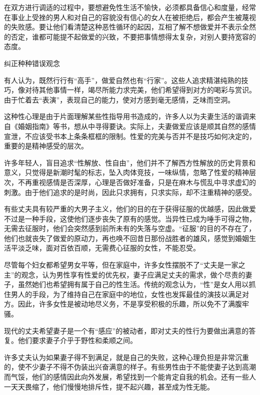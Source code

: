 \documentclass[12pt,UTF8]{ctexbook}
\begin{document}
在双方进行调适的过程中，要想避免性生活不愉快，必须都具备信心和度量，经常在事业上受挫的男人和对自己的容貌没有信心的女人在被拒绝后，都会产生被蔑视的失败感。要让他们看清楚这种恶性循环的起因，互相了解不想做爱并不表示全然的否定，谁都可能提不起做爱的兴致，不要把事情想得太复杂，对别人要持宽容的态度。





纠正种种错误观念


有人认为，既然行行有“高手”，做爱自然也有“行家”。这些人追求精湛纯熟的技巧，像对待其他事情一样，竭尽所能力求完美，他们希望得到对方的喝彩与赏识。由于忙着去“表演”，表现自己的能力，使对方感到毫无感情，乏味而空洞。

这种性心理是由于片面理解某些性指导用书造成的，许多人以为夫妻生活的谐调来自《婚姻指南》等书，想从中寻得要诀。实际上，夫妻做爱应该是顺其自然的感情宣泄，不应该受书本上条条框框的限制。性爱的完美与否并不是技巧如何决定的，重要的是精神感受的层次。

许多年轻人，盲目追求“性解放、性自由”，他们并不了解西方性解放的历史背景和意义，只觉得是新潮时髦的标志，坠入肉体竞技，一味纵情，忽略了性爱的精神层次，不再重视感情是否深厚，心理是否做好准备，只是在麻木与慌乱中寻求虚幻的刺激。由于他们追求的是时尚，因此只求拥有，只求实际，却不注重精神的感受。

有些丈夫具有较严重的大男子主义，他们的目的在于获得征服的优越感，因此做爱不过是一种手段，这使他们逐步丧失了原有的感觉。当异性已成为唾手可得之物，无需去征服时，他们会突然感到前所未有的失落与空虚。“征服”的目的不存在了，他们也就丧失了做爱的原动力，再也唤不回昔日那份战胜者的雄风，感觉到婚姻生活平淡乏味，面对百依百顺，无需费心征服的女性，不能忍受。

尽管每个妇女都希望男女平等，但在家庭中，许多女性摆脱不了“丈夫是一家之主”的观念，认为男性享有性爱的优先权，妻子应满足丈夫的需求，做个尽责的妻子，虽然她们也希望拥有属于自己的性生活。传统的观念认为，“性”是女人用以抓住男人的手段，为了维持自己在家庭中的地位，女性也发挥最佳的演技以满足对方。因此，许多女性是被动地尽义务，不是享受积极的乐趣，所以免不了满腹牢骚。

现代的丈夫希望妻子是一个有“感应”的被动者，即对丈夫的性行为要做出满意的答复。他们要求妻子介乎于野性和柔顺之间。

许多丈夫认为如果妻子得不到满足，就是自己的失败，这种心理负担是非常沉重的，使不少妻子不得不伪装出兴奋满意的样子。有些男性由于不能使妻子达到高潮而气馁，他们的感情因此向外发展，希望找到一个能肯定自我的机会。还有一些人一天天畏缩了，他们慢慢地排斥性，提不起兴趣，甚至成为性无能。
\end{document}
